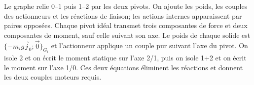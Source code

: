 \begin{corrigebox}
Le graphe relie 0--1 puis 1--2 par les deux pivots. On ajoute les
                poids, les couples des actionneurs et les réactions de liaison; les actions
                internes apparaissent par paires opposées.
Chaque pivot idéal transmet trois composantes de force et deux
                composantes de moment, sauf celle suivant son axe. Le poids de chaque
                solide est $\{-m_i g\vec j_0;\vec0\}_{G_i}$ et l'actionneur applique un
                couple pur suivant l'axe du pivot.
On isole 2 et on écrit le moment statique sur l'axe 2/1, puis on isole
                1+2 et on écrit le moment sur l'axe 1/0. Ces deux équations éliminent les
                réactions et donnent les deux couples moteurs requis.
\end{corrigebox}
